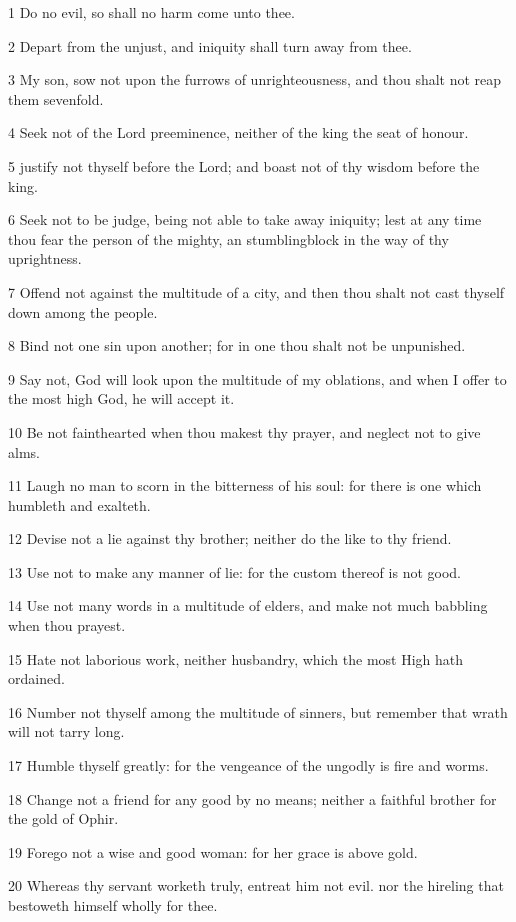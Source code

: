 \par 1 Do no evil, so shall no harm come unto thee.
\par 2 Depart from the unjust, and iniquity shall turn away from thee.
\par 3 My son, sow not upon the furrows of unrighteousness, and thou shalt not reap them sevenfold.
\par 4 Seek not of the Lord preeminence, neither of the king the seat of honour.
\par 5 justify not thyself before the Lord; and boast not of thy wisdom before the king.
\par 6 Seek not to be judge, being not able to take away iniquity; lest at any time thou fear the person of the mighty, an stumblingblock in the way of thy uprightness.
\par 7 Offend not against the multitude of a city, and then thou shalt not cast thyself down among the people.
\par 8 Bind not one sin upon another; for in one thou shalt not be unpunished.
\par 9 Say not, God will look upon the multitude of my oblations, and when I offer to the most high God, he will accept it.
\par 10 Be not fainthearted when thou makest thy prayer, and neglect not to give alms.
\par 11 Laugh no man to scorn in the bitterness of his soul: for there is one which humbleth and exalteth.
\par 12 Devise not a lie against thy brother; neither do the like to thy friend.
\par 13 Use not to make any manner of lie: for the custom thereof is not good.
\par 14 Use not many words in a multitude of elders, and make not much babbling when thou prayest.
\par 15 Hate not laborious work, neither husbandry, which the most High hath ordained.
\par 16 Number not thyself among the multitude of sinners, but remember that wrath will not tarry long.
\par 17 Humble thyself greatly: for the vengeance of the ungodly is fire and worms.
\par 18 Change not a friend for any good by no means; neither a faithful brother for the gold of Ophir.
\par 19 Forego not a wise and good woman: for her grace is above gold.
\par 20 Whereas thy servant worketh truly, entreat him not evil. nor the hireling that bestoweth himself wholly for thee.
